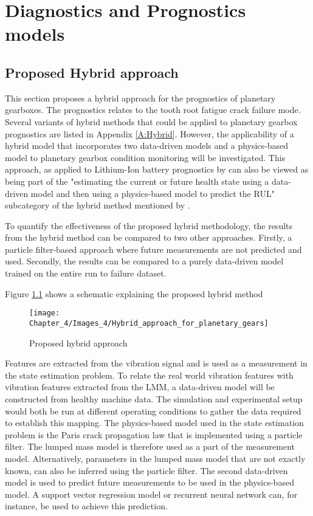 
\chapter{Diagnostics and Prognostics models}


\section{Proposed Hybrid approach}
This section proposes a hybrid approach for the prognostics of planetary gearboxes. The prognostics relates to the tooth root fatigue crack failure mode. 
Several variants of hybrid methods that could be applied to planetary gearbox prognostics are listed in Appendix \ref{A:Hybrid}. However, the applicability of a hybrid model that incorporates two data-driven models and a physics-based model to planetary gearbox condition monitoring will be investigated. This approach, as applied to Lithium-Ion battery prognostics by \cite{Liao2016} can also be viewed as being part of the "estimating the current or future health state using a data-driven model and then using a physics-based model to predict the RUL" subcategory of the hybrid method mentioned by \cite{Xia2018}.

To quantify the effectiveness of the proposed hybrid methodology, the results from the hybrid method can be compared to two other approaches. Firstly, a particle filter-based approach where future measurements are not predicted and used. Secondly, the results can be compared to a purely data-driven model trained on the entire run to failure dataset. 

Figure \ref{F:Hybrid} shows a schematic explaining the proposed hybrid method

\begin{figure}[H]
	\centering
	\hspace*{-1cm}   
	\texttt{[image: Chapter\_4/Images\_4/Hybrid\_approach\_for\_planetary\_gears]}
	\caption{Proposed hybrid approach}
	\label{F:Hybrid}
\end{figure}

Features are extracted from the vibration signal and is used as a measurement in the state estimation problem. To relate the real world vibration features with vibration features extracted from the LMM, a data-driven model will be constructed from healthy machine data. The simulation and experimental setup would both be run at different operating conditions to gather the data required to establish this mapping. The physics-based model used in the state estimation problem is the Paris crack propagation law that is implemented using a particle filter. The lumped mass model is therefore used as a part of the measurement model. Alternatively, parameters in the lumped mass model that are not exactly known, can also be inferred using the particle filter. The second data-driven model is used to predict future measurements to be used in the physics-based model. A support vector regression model or recurrent neural network can, for instance, be used to achieve this prediction. 

